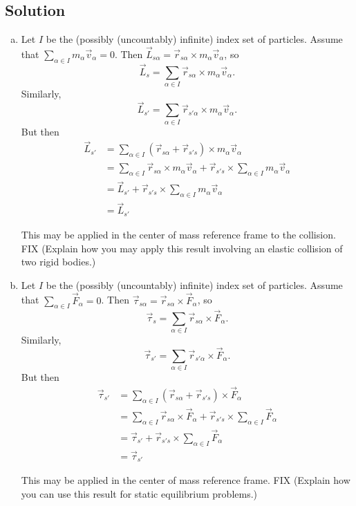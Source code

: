 \documentclass[solutions]{esg8012pset}
\begin{document}
\subsection*{Solution}
  \begin{enumerate}[(a)]
    \item Let $I$ be the (possibly (uncountably) infinite) index set of particles.  Assume that $\displaystyle \sum_{\alpha\in I} m_\alpha \vec v_\alpha = 0$.  Then $\vec L_{s\alpha} = \vec r_{s\alpha} \times m_\alpha \vec v_\alpha$, so $$\displaystyle \vec L_{s} = \sum_{\alpha\in I}\vec r_{s\alpha} \times m_\alpha \vec v_\alpha.$$  Similarly, $$\displaystyle \vec L_{s'} = \sum_{\alpha\in I}\vec r_{s'\alpha} \times m_\alpha \vec v_\alpha.$$  But then \begin{align*}
    \vec L_{s'} & = \sum_{\alpha\in I}(\vec r_{s\alpha} + \vec r_{s's}) \times m_\alpha \vec v_\alpha \\
    & = \sum_{\alpha\in I}\vec r_{s\alpha} \times m_\alpha \vec v_\alpha + \vec r_{s's} \times \sum_{\alpha\in I} m_\alpha \vec v_\alpha \\
    & = \vec L_{s'} + \vec r_{s's} \times \sum_{\alpha\in I} m_\alpha \vec v_\alpha \\
    & = \vec L_{s'}
    \end{align*} \par
    This may be applied in the center of mass reference frame to the collision.  FIX (Explain how you may apply this result involving an elastic collision of two rigid bodies.)
    \item Let $I$ be the (possibly (uncountably) infinite) index set of particles.  Assume that $\displaystyle \sum_{\alpha\in I} \vec F_\alpha = 0$.  Then $\vec \tau_{s\alpha} = \vec r_{s\alpha} \times \vec F_\alpha$, so $$\displaystyle \vec \tau_{s} = \sum_{\alpha\in I}\vec r_{s\alpha} \times \vec F_\alpha.$$  Similarly, $$\displaystyle \vec \tau_{s'} = \sum_{\alpha\in I}\vec r_{s'\alpha} \times \vec F_\alpha.$$  But then \begin{align*}
    \vec \tau_{s'} & = \sum_{\alpha\in I}(\vec r_{s\alpha} + \vec r_{s's}) \times \vec F_\alpha \\
    & = \sum_{\alpha\in I}\vec r_{s\alpha} \times \vec F_\alpha + \vec r_{s's} \times \sum_{\alpha\in I} \vec F_\alpha \\
    & = \vec \tau_{s'} + \vec r_{s's} \times \sum_{\alpha\in I} \vec F_\alpha \\
    & = \vec \tau_{s'}
    \end{align*} \par
    This may be applied in the center of mass reference frame. FIX (Explain how you can use this result for static equilibrium problems.)
  \end{enumerate}
\end{document}
